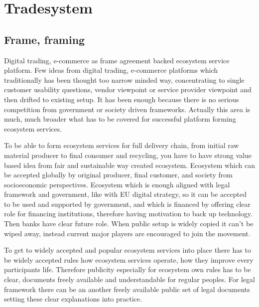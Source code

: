 %
%
%

\part{Tradesystem}\label{tradesystem}
\chapter{Frame, framing}\label{frame_framing}
Digital trading, e-commerce as frame agreement backed ecosystem service
platform. Few ideas from digital trading, e-com\-mer\-ce platforms which
traditionally has been thought too narrow mind\-ed way, concentrating to
single customer usability questions, vendor viewpoint or service provider
viewpoint and then drifted to existing setup. It has been enough because there
is no serious competition from government or society driven frameworks.
Actually this area is much, much broader what has to be covered for successful
platform forming ecosystem services.

To be able to form ecosystem services for full delivery chain, from initial
raw material producer to final consumer and recycling, you have to have strong
value based idea from fair and sustainable way created ecosystem. Ecosystem
which can be accepted globally by original producer, final customer, and
society from socioeconomic perspectives. Ecosystem which is enough aligned
with legal framework and government, like with EU digital strategy, so it can
be accepted to be used and supported by government, and which is financed by
offering clear role for financing institutions, therefore having motivation to
back up technology. Then banks have clear future role. When public setup is
widely copied it can't be wiped away, instead current major players are
encouraged to join the movement.

To get to widely accepted and popular ecosystem services into place there has
to be widely accepted rules how ecosystem services operate, how they improve
every participants life. Therefore publicity especially for ecosystem own
rules has to be clear, documents freely available and understandable for
regular peoples. For legal framework there can be an another freely available
public set of legal documents setting these clear explanations into practice.

